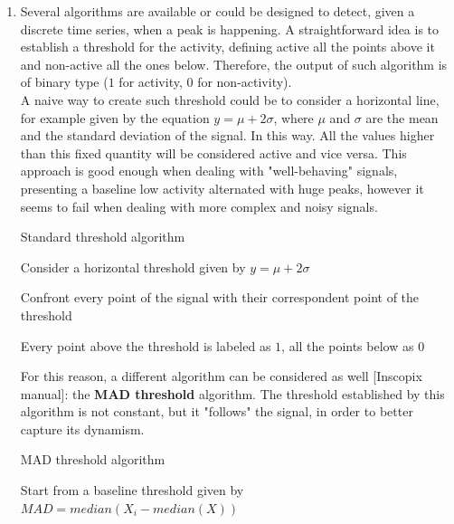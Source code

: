 \documentclass[a4paper]{article}
\begin{document}
\begin{enumerate}
	
	\item Several algorithms are available or could be designed to detect, given a discrete time series, when a peak is happening. A straightforward idea is to establish a threshold for the activity, defining active all the points above it and non-active  all the ones below. Therefore, the output of such algorithm is of binary type ($1$ for activity, $0$ for non-activity).\\
	
	A naive way to create such threshold could be to consider a horizontal line, for example given by the equation $ y = \mu + 2\sigma $,	where $\mu$ and $\sigma$ are the mean and the standard deviation of the signal. In this way. All the values higher than this fixed quantity will be considered active and vice versa. This approach is good enough when dealing with "well-behaving" signals, presenting a baseline low activity alternated with huge peaks, however it seems to fail when dealing with more complex and noisy signals.\\
	\begin{algorithm}
		\caption{Standard threshold algorithm}\label{tresh}
		\begin{algorithmic}[1]
			
			
			\State Consider a horizontal threshold given by $ y = \mu + 2\sigma $
			
			\State Confront every point of the signal with their correspondent point of the threshold
			
			\State Every point above the threshold is labeled as $1$, all the points below as $0$
		\end{algorithmic}
	\end{algorithm}
	
	
	For this reason, a different algorithm can be considered as well [Inscopix manual]: the \textbf{MAD threshold} algorithm. The threshold established by this algorithm is not constant, but it "follows" the signal, in order to better capture its dynamism. 
	
	
	
	
	
	
	
	\begin{algorithm}
		\caption{MAD threshold algorithm}\label{mad}
		\begin{algorithmic}[1]
			
			
			\State Start from a baseline threshold given by $ MAD = median(X_i - median(X))$
			

\end{algorithmic}
\end{algorithm}
\end{enumerate}
\end{document}

